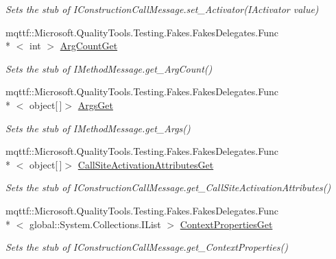 \begin{DoxyCompactItemize}
\begin{DoxyCompactList}\small\item\em Sets the stub of I\-Construction\-Call\-Message.\-set\-\_\-\-Activator(\-I\-Activator value)\end{DoxyCompactList}\item 
mqttf\-::\-Microsoft.\-Quality\-Tools.\-Testing.\-Fakes.\-Fakes\-Delegates.\-Func\\*
$<$ int $>$ \hyperlink{class_system_1_1_runtime_1_1_remoting_1_1_activation_1_1_fakes_1_1_stub_i_construction_call_message_a025a060e275213677132a6635a20cf29}{Arg\-Count\-Get}
\begin{DoxyCompactList}\small\item\em Sets the stub of I\-Method\-Message.\-get\-\_\-\-Arg\-Count()\end{DoxyCompactList}\item 
mqttf\-::\-Microsoft.\-Quality\-Tools.\-Testing.\-Fakes.\-Fakes\-Delegates.\-Func\\*
$<$ object\mbox{[}$\,$\mbox{]}$>$ \hyperlink{class_system_1_1_runtime_1_1_remoting_1_1_activation_1_1_fakes_1_1_stub_i_construction_call_message_ae0289278793d54df4b28ccf080282284}{Args\-Get}
\begin{DoxyCompactList}\small\item\em Sets the stub of I\-Method\-Message.\-get\-\_\-\-Args()\end{DoxyCompactList}\item 
mqttf\-::\-Microsoft.\-Quality\-Tools.\-Testing.\-Fakes.\-Fakes\-Delegates.\-Func\\*
$<$ object\mbox{[}$\,$\mbox{]}$>$ \hyperlink{class_system_1_1_runtime_1_1_remoting_1_1_activation_1_1_fakes_1_1_stub_i_construction_call_message_ad1dbdccb3e5d7e6bd2a48d4cb04214e1}{Call\-Site\-Activation\-Attributes\-Get}
\begin{DoxyCompactList}\small\item\em Sets the stub of I\-Construction\-Call\-Message.\-get\-\_\-\-Call\-Site\-Activation\-Attributes()\end{DoxyCompactList}\item 
mqttf\-::\-Microsoft.\-Quality\-Tools.\-Testing.\-Fakes.\-Fakes\-Delegates.\-Func\\*
$<$ global\-::\-System.\-Collections.\-I\-List $>$ \hyperlink{class_system_1_1_runtime_1_1_remoting_1_1_activation_1_1_fakes_1_1_stub_i_construction_call_message_a517366d369be47595aee9811bab7cfd7}{Context\-Properties\-Get}
\begin{DoxyCompactList}\small\item\em Sets the stub of I\-Construction\-Call\-Message.\-get\-\_\-\-Context\-Properties()\end{DoxyCompactList}\item 

\end{DoxyCompactItemize}
